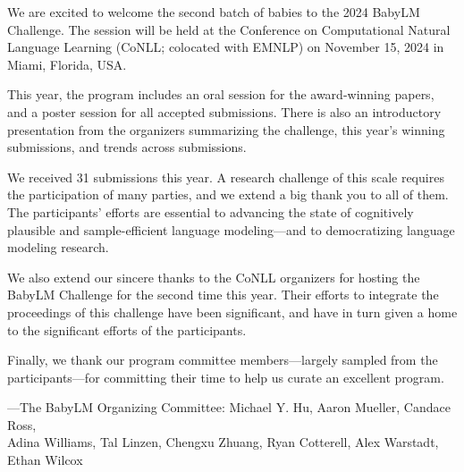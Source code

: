 We are excited to welcome the second batch of babies to the 2024 BabyLM Challenge. The session will be held at the Conference on Computational Natural Language Learning (CoNLL; colocated with EMNLP) on November 15, 2024 in Miami, Florida, USA. 

\vspace{1em}

This year, the program includes an oral session for the award-winning papers, and a poster session for all accepted submissions. There is also an introductory presentation from the organizers summarizing the challenge, this year's winning submissions, and trends across submissions.

\vspace{1em}

We received 31 submissions this year. A research challenge of this scale requires the participation of many parties, and we extend a big thank you to all of them. The participants' efforts are essential to advancing the state of cognitively plausible and sample-efficient language modeling---and to democratizing language modeling research.

\vspace{1em}

We also extend our sincere thanks to the CoNLL organizers for hosting the BabyLM Challenge for the second time this year. Their efforts to integrate the proceedings of this challenge have been significant, and have in turn given a home to the significant efforts of the participants.

\vspace{1em}

Finally, we thank our program committee members---largely sampled from the participants---for committing their time to help us curate an excellent program.

\vspace{1em}

---The BabyLM Organizing Committee: Michael Y. Hu, Aaron Mueller, Candace Ross,\\ Adina Williams, Tal Linzen, Chengxu Zhuang, Ryan Cotterell, Alex Warstadt, Ethan Wilcox

